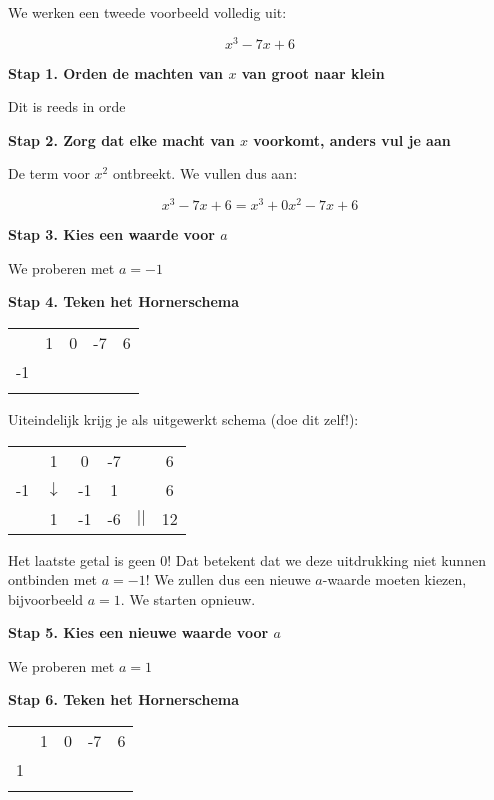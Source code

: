 \begin{voorbeeld}
	We werken een tweede voorbeeld volledig uit:
	
	\begin{equation*}
	x^3-7x+6
	\end{equation*}

\textbf{Stap 1. Orden de machten van $x$ van groot naar klein}

Dit is reeds in orde

\textbf{Stap 2. Zorg dat elke macht van $x$ voorkomt, anders vul je aan}

De term voor $x^2$ ontbreekt. We vullen dus aan: 

\begin{equation*}
x^3-7x+6 = x^3+0x^2-7x+6
\end{equation*}

\textbf{Stap 3. Kies een waarde voor $a$}

We proberen met $a=-1$


\textbf{Stap 4. Teken het Hornerschema}

\begin{center}
	\begin{tabular}{c|cccc}
		& 1 & 0 & -7 & 6 \\
		-1 &  &  &  & \\
		\hline 
		&  &  &  & 
	\end{tabular}
\end{center}

Uiteindelijk krijg je als uitgewerkt schema (doe dit zelf!):

\begin{center}
	\begin{tabular}{c|ccccc}
		& 1 & 0 & -7 & & 6 \\
		-1 & $\downarrow$ & -1 & 1 & & 6\\
		\hline 
		& 1 & -1 & -6 & $||$ & 12
	\end{tabular}
\end{center}

Het laatste getal is geen 0! Dat betekent dat we deze uitdrukking niet kunnen ontbinden met $a=-1$! We zullen dus een nieuwe $a$-waarde moeten kiezen, bijvoorbeeld $a=1$. We starten opnieuw.

\textbf{Stap 5. Kies een nieuwe waarde voor $a$}


We proberen met $a=1$

\textbf{Stap 6. Teken het Hornerschema}

\begin{center}
	\begin{tabular}{c|cccc}
		& 1 & 0 & -7 & 6 \\
		1 &  &  &  & \\
		\hline 
		&  &  &  & 
	\end{tabular}
\end{center}


\end{voorbeeld}
